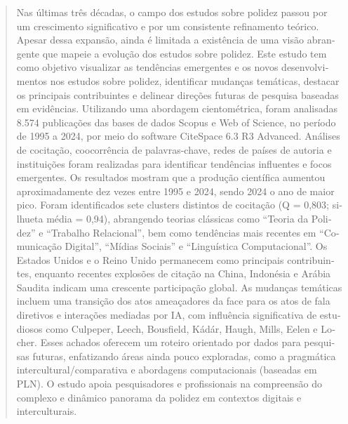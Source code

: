 \documentclass[english]{textolivre}
\begin{document}
\begin{polyabstract}
\begin{portuguese}
\begin{abstract}
Nas últimas três décadas, o campo dos estudos sobre polidez passou por um crescimento significativo e por um consistente refinamento teórico. Apesar dessa expansão, ainda é limitada a existência de uma visão abrangente que mapeie a evolução dos estudos sobre polidez. Este estudo tem como objetivo visualizar as tendências emergentes e os novos desenvolvimentos nos estudos sobre polidez, identificar mudanças temáticas, destacar os principais contribuintes e delinear direções futuras de pesquisa baseadas em evidências. Utilizando uma abordagem cientométrica, foram analisadas 8.574 publicações das bases de dados Scopus e Web of Science, no período de 1995 a 2024, por meio do software CiteSpace 6.3 R3 Advanced. Análises de cocitação, coocorrência de palavras-chave, redes de países de autoria e instituições foram realizadas para identificar tendências influentes e focos emergentes. Os resultados mostram que a produção científica aumentou aproximadamente dez vezes entre 1995 e 2024, sendo 2024 o ano de maior pico. Foram identificados sete clusters distintos de cocitação (Q = 0,803; silhueta média = 0,94), abrangendo teorias clássicas como ``Teoria da Polidez'' e ``Trabalho Relacional'', bem como tendências mais recentes em ``Comunicação Digital'', ``Mídias Sociais'' e ``Linguística Computacional''. Os Estados Unidos e o Reino Unido permanecem como principais contribuintes, enquanto recentes explosões de citação na China, Indonésia e Arábia Saudita indicam uma crescente participação global. As mudanças temáticas incluem uma transição dos atos ameaçadores da face para os atos de fala diretivos e interações mediadas por IA, com influência significativa de estudiosos como Culpeper, Leech, Bousfield, Kádár, Haugh, Mills, Eelen e Locher. Esses achados oferecem um roteiro orientado por dados para pesquisas futuras, enfatizando áreas ainda pouco exploradas, como a pragmática intercultural/comparativa e abordagens computacionais (baseadas em PLN). O estudo apoia pesquisadores e profissionais na compreensão do complexo e dinâmico panorama da polidez em contextos digitais e interculturais.

\end{abstract}
\end{portuguese}
\end{polyabstract}
\end{document}
